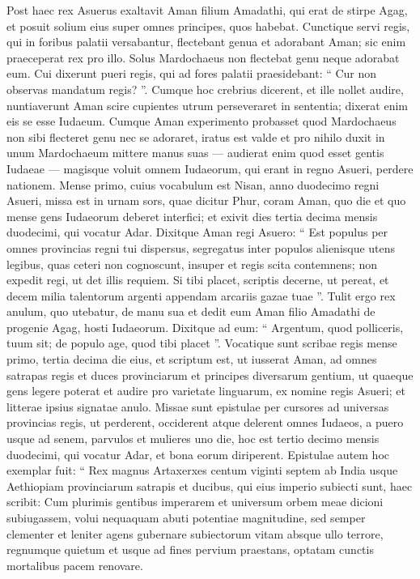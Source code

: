 \begin{biblechapter}
\begin{biblechapter}
\begin{biblechapter}
\verse Post haec rex Asuerus exaltavit Aman filium Amadathi, qui erat de stirpe Agag, et posuit solium eius super omnes principes, quos habebat. 
\verse Cunctique servi regis, qui in foribus palatii versabantur, flectebant genua et adorabant Aman; sic enim praeceperat rex pro illo. Solus Mardochaeus non flectebat genu neque adorabat eum. 
\verse Cui dixerunt pueri regis, qui ad fores palatii praesidebant: “ Cur non observas mandatum regis? ”. 
\verse Cumque hoc crebrius dicerent, et ille nollet audire, nuntiaverunt Aman scire cupientes utrum perseveraret in sententia; dixerat enim eis se esse Iudaeum.
 \verse Cumque Aman experimento probasset quod Mardochaeus non sibi flecteret genu nec se adoraret, iratus est valde 
\verse et pro nihilo duxit in unum Mardochaeum mittere manus suas — audierat enim quod esset gentis Iudaeae — magisque voluit omnem Iudaeorum, qui erant in regno Asueri, perdere nationem.
 \verse Mense primo, cuius vocabulum est Nisan, anno duodecimo regni Asueri, missa est in urnam sors, quae dicitur Phur, coram Aman, quo die et quo mense gens Iudaeorum deberet interfici; et exivit dies tertia decima mensis duodecimi, qui vocatur Adar. 
\verse Dixitque Aman regi Asuero: “ Est populus per omnes provincias regni tui dispersus, segregatus inter populos alienisque utens legibus, quas ceteri non cognoscunt, insuper et regis scita contemnens; non expedit regi, ut det illis requiem. 
\verse Si tibi placet, scriptis decerne, ut pereat, et decem milia talentorum argenti appendam arcariis gazae tuae ”. 
\verse Tulit ergo rex anulum, quo utebatur, de manu sua et dedit eum Aman filio Amadathi de progenie Agag, hosti Iudaeorum. 
\verse Dixitque ad eum: “ Argentum, quod polliceris, tuum sit; de populo age, quod tibi placet ”.
 \verse Vocatique sunt scribae regis mense primo, tertia decima die eius, et scriptum est, ut iusserat Aman, ad omnes satrapas regis et duces provinciarum et principes diversarum gentium, ut quaeque gens legere poterat et audire pro varietate linguarum, ex nomine regis Asueri; et litterae ipsius signatae anulo. 
\verse Missae sunt epistulae per cursores ad universas provincias regis, ut perderent, occiderent atque delerent omnes Iudaeos, a puero usque ad senem, parvulos et mulieres uno die, hoc est tertio decimo mensis duodecimi, qui vocatur Adar, et bona eorum diriperent.
 \versea Epistulae autem hoc exemplar fuit:
 “ Rex magnus Artaxerxes centum viginti septem ab India usque Aethiopiam provinciarum satrapis et ducibus, qui eius imperio subiecti sunt, haec scribit: 
\verseb Cum plurimis gentibus imperarem et universum orbem meae dicioni subiugassem, volui nequaquam abuti potentiae magnitudine, sed semper clementer et leniter agens gubernare subiectorum vitam absque ullo terrore, regnumque quietum et usque ad fines pervium praestans, optatam cunctis mortalibus pacem renovare. 

\end{biblechapter}
\end{biblechapter}
\end{biblechapter}
